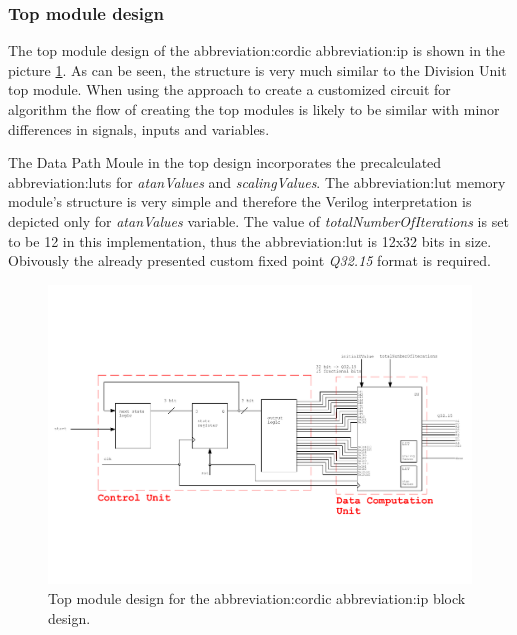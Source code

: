 \documentclass[a4paper, twoside, 11pt]{article}
\newcommand{\fbar}{\FloatBarrier}
\begin{document}
        \subsubsection{Top module design}
            The top module design of the \gls{abbreviation:cordic} \gls{abbreviation:ip} is shown in the picture \ref{fig:cordic-top-module}. As can be seen, the structure is very much similar to the Division Unit top module. When using the approach to create a customized circuit for algorithm the flow of creating the top modules is likely to be similar with minor differences in signals, inputs and variables.\par
            The Data Path Moule in the top design incorporates the precalculated \gls{abbreviation:lut}s for \textit{atanValues} and \textit{scalingValues}. The \gls{abbreviation:lut} memory module's structure is very simple and therefore the Verilog interpretation is depicted only for \textit{atanValues} variable. The value of \textit{totalNumberOfIterations} is set to be 12 in this implementation, thus the \gls{abbreviation:lut} is 12x32 bits in size. Obivously the already presented custom fixed point \textit{Q32.15} format is required.
            \begin{figure}[htbp!]
                \centering
                \includegraphics[width=1\textwidth]{src/pdf/cordic-top-module.pdf}
                \caption{Top module design for the \gls{abbreviation:cordic} \gls{abbreviation:ip} block design.}
                \label{fig:cordic-top-module}
            \end{figure}
        \fbar
\end{document}
